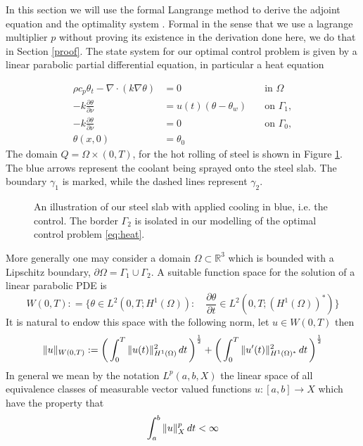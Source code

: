 
In this section we will use the formal Langrange method to derive the adjoint equation and the optimality system \cite{optimalControl}. Formal in the sense that we use a lagrange multiplier $p$ without proving its existence in the derivation done here, we do that in Section \ref{proof}. The state system for our optimal control problem is given by a linear parabolic partial differential equation, in particular a heat equation

\begin{align*}
      \rho c_p \theta_t - \nabla \cdot (k \nabla \theta) &= 0 \quad &\text{in } \Omega \\
      -k \frac{\partial \theta}{\partial \nu} &= u(t) (\theta - \theta_w) \quad &\text{on } \Gamma_1, \\
      -k \frac{\partial \theta}{\partial \nu} &= 0 \quad &\text{on } \Gamma_0, \\
      \theta(x, 0) &= \theta_0 &
\end{align*}
The domain $Q = \Omega \times (0,T)$, for the hot rolling of steel is shown in Figure \ref{fig:steel_slab}. The blue arrows represent the coolant being sprayed onto the steel slab. The boundary $\gamma_1$ is marked, while the dashed lines represent $\gamma_2$. 
\begin{figure}
    \centering
    
    \caption{An illustration of our steel slab with applied cooling in blue, i.e. the control. The border $\Gamma_2$ is isolated in our modelling of the optimal control problem \eqref{eq:heat}.}
    \label{fig:steel_slab}
\end{figure}

More generally one may consider a domain $\Omega \subset \mathbb{R}^3$ which is bounded with a Lipschitz boundary, $\partial \Omega = \Gamma_1 \cup \Gamma_2$. A suitable function space for the solution of a linear parabolic PDE is 
\begin{equation}
    \label{eq:funcSpace}
    W(0,T) : = \{ \theta \in L^2(0,T;H^1(\Omega)) : \quad \frac{\partial \theta}{\partial t} \in L^2(0,T;(H^1(\Omega))^{*}) \}
\end{equation}
It is natural to endow this space with the following norm, let $u \in W(0,T)$ then 
\begin{equation*}
    \|u\|_{W(0,T)} := \bigg (\int_{0}^T\|u(t)\|^2_{H^{1}(\Omega)}\mathop{dt} \bigg ) ^{\frac{1}{2}} + \bigg (\int_{0}^T\|u'(t)\|^2_{H^{1}(\Omega)^{*}}\mathop{dt} \bigg ) ^{\frac{1}{2}}
\end{equation*}
In general we mean by the notation $L^{p}(a,b,X)$ the linear space of all equivalence classes of measurable vector valued functions $u:[a,b] \rightarrow X$ which have the property that
\begin{equation*}
    \int_{a}^b\|u\|_X^p \mathop{dt}<\infty
\end{equation*}

